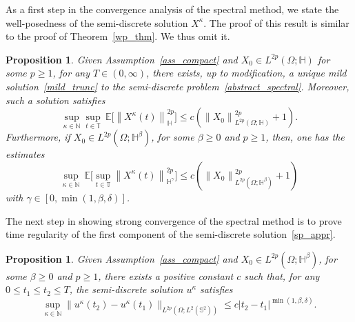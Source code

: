 \documentclass[a4paper]{amsart}
\newtheorem{prop}[thm]{Proposition}
\theoremstyle{remark}
\theoremstyle{definition}
\newcommand{\N}{\mathbb{N}}
\newcommand{\HH}{\mathbb{H}}
\newcommand{\IT}{\mathbb{T}}
\begin{document}
As a first step in the convergence analysis of the spectral method, we state the well-posedness of the semi-discrete solution $X^\kappa$. The proof of this result is similar to the proof of Theorem~\ref{wp_thm}. We thus omit it.
\begin{prop}
\label{wp_trunc}
Given Assumption~\ref{ass_compact} and $X_0\in L^{2p}\left(\Omega; \HH\right)$ for some $p\ge 1$, for any $T\in(0,\infty)$,  there exists, up to modification, a unique mild solution~\eqref{mild_trunc} to the semi-discrete problem~\eqref{abstract_spectral}. Moreover, such a solution satisfies
\begin{equation}
\label{bo_0_H}
\sup_{\kappa \in \N}\sup_{t\in\IT}\ \mathbb{E}\bigg[\left\|X^\kappa(t)\right\|^{2p}_{\HH}\bigg]\le c\left(\left\|X_0\right\|_{L^{2p}(\Omega;\HH)}^{2p}+1\right).
\end{equation}
Furthermore, if $X_0\in L^{2p}\left(\Omega; {\HH}^\beta\right)$, for some $\beta\ge0$ and $p\ge 1$, then, one has the estimates
\begin{equation}
\label{bo_0}
\sup_{\kappa \in \N}\ \mathbb{E}\bigg[\sup_{t\in\IT}\left\|X^\kappa(t)\right\|^{2p}_{{\HH}^\gamma}\bigg]\le c\left(\left\|X_0\right\|_{L^{2p}(\Omega;{\HH}^\beta)}^{2p}+1\right)
\end{equation}
with $\gamma \in [0,\min\left(1,\beta,\delta\right)]$.
\end{prop}

The next step in showing strong convergence of the spectral method is to prove 
time regularity of the first component of the semi-discrete solution~\eqref{sp_appr}.
\begin{prop}
\label{time_reg}
Given Assumption~\ref{ass_compact} and $X_0\in L^{2p}(\Omega; {\HH}^\beta)$, for some $\beta\ge0$ and $p\ge 1$, there exists a positive constant $c$ such that, for any $0\le t_1\le t_2\le T$, the semi-discrete solution $u^\kappa$ satisfies
$$
\sup_{\kappa\in\mathbb{N}} \big\|u^\kappa(t_2)-u^\kappa(t_1)\big\|_{L^{2p}(\Omega; L^2(\mathbb{S}^2))}\le c \left|t_2-t_1\right|^{\min(1,\beta,\delta)}.
$$
\end{prop}
\end{document}
